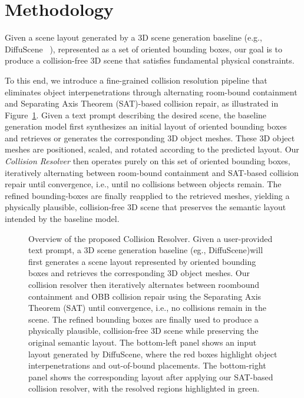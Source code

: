 \section{Methodology}
\label{sec:method}

Given a scene layout generated by a 3D scene generation baseline (e.g., DiffuScene ~\cite{tang2024diffuscenedenoisingdiffusionmodels}), represented as a set of oriented bounding boxes, our goal is to produce a collision-free 3D scene that satisfies fundamental physical constraints.

To this end, we introduce a fine-grained collision resolution pipeline that eliminates object interpenetrations through alternating room-bound containment and Separating Axis Theorem (SAT)-based collision repair, as illustrated in 
Figure~\ref{fig:pipeline}. Given a text prompt describing the desired scene, the baseline generation model first synthesizes an initial layout of oriented bounding boxes and retrieves or generates the corresponding 3D object meshes. These 3D object meshes are positioned, scaled, and rotated according to the predicted layout. Our \emph{Collision Resolver} then operates purely on this set of oriented bounding boxes, iteratively alternating between room-bound containment and SAT-based collision repair until convergence, i.e., until no collisions between objects remain. The refined bounding-boxes are finally reapplied to the retrieved meshes, yielding a physically plausible, collision-free 3D scene that preserves the semantic layout intended by the baseline model.
\label{sec:method:prelim}
\begin{figure}[t]
    \centering
    
    \caption{Overview of the proposed Collision Resolver. Given a user-provided text prompt, a 3D scene generation baseline (eg., DiffuScene)will first generates a scene layout represented by oriented bounding boxes and retrieves the corresponding 3D object meshes. Our collision resolver then iteratively alternates between roombound containment and OBB collision repair using the Separating Axis Theorem (SAT) until convergence, i.e., no collisions remain in the scene. The refined bounding boxes are finally used to produce a physically plausible, collision-free 3D scene while preserving the original semantic layout. The bottom-left panel shows an input layout generated by DiffuScene, where the red boxes highlight object interpenetrations and out-of-bound placements. The bottom-right panel shows the corresponding layout after applying our SAT-based collision resolver, with the resolved regions highlighted in green.}
    \label{fig:pipeline}
\end{figure}

